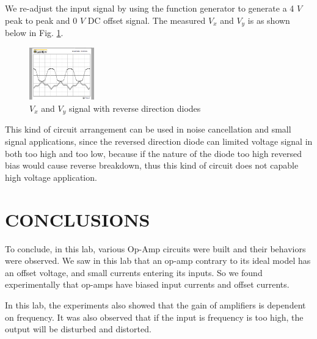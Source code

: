 \documentclass[letterpaper, 10 pt, conference]{ieeeconf}  %
\begin{document}
\par We re-adjust the input signal by using the function generator to generate a
4 $V$ peak to peak and 0 $V$ DC offset signal. The measured $V_{x}$ and $V_{y}$
is as shown below in Fig. \ref{fig:6.4}.
\begin{figure}[ht]
  \centering
  \includegraphics[width=0.25\textwidth]{images/6_4.png}
  \caption{$V_{x}$ and $V_{y}$ signal with reverse direction diodes}
  \label{fig:6.4}
\end{figure}
\par This kind of circuit arrangement can be used in noise cancellation and
small signal applications, since the reversed direction diode can limited voltage
signal in both too high and too low, because if the nature of the diode too high
reversed bias would cause reverse breakdown, thus this kind of circuit does not
capable high voltage application.
\clearpage
\section{CONCLUSIONS}
\par To conclude, in this lab, various Op-Amp circuits were built and their behaviors were observed.
We saw in this lab that an op-amp contrary to its ideal model has an offset voltage,
and small currents entering its inputs. So we found experimentally that op-amps have biased input currents and offset currents.
\par In this lab, the experiments also showed that the gain of amplifiers is dependent on frequency. It was also observed that if the input is frequency is too high, the output will be disturbed and distorted.


\end{document}
